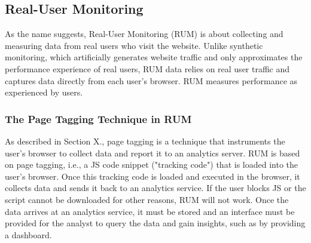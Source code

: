 



\subsection{Real-User Monitoring} %
\label{subsection:RUM}

As the name suggests, Real-User Monitoring (RUM) is about collecting and measuring data from real users who visit the website.
Unlike synthetic monitoring, which artificially generates website traffic and only approximates the performance experience of real users, RUM data relies on real user traffic and captures data directly from each user's browser. 
RUM measures performance as experienced by users. %


\subsubsection{The Page Tagging Technique in RUM} %


As described in Section X., page tagging is a technique that instruments the user's browser to collect data and report it to an analytics server.
RUM is based on page tagging, i.e., a JS code snippet ("tracking code") that is loaded into the user's browser.
Once this tracking code is loaded and executed in the browser, it collects data and sends it back to an analytics service.
If the user blocks JS or the script cannot be downloaded for other reasons, RUM will not work.
Once the data arrives at an analytics service, it must be stored and an interface must be provided for the analyst to query the data and gain insights, such as by providing a dashboard.

